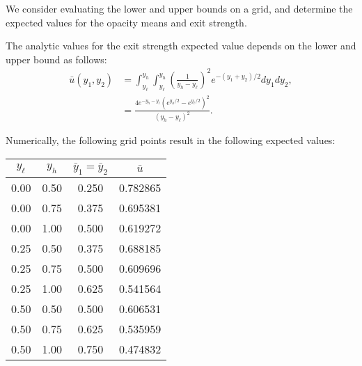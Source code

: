 We consider evaluating the lower and upper bounds
on a grid, and determine the expected values for the opacity means and exit strength.

The analytic values for the exit strength expected value depends on the lower and upper bound
as follows:
\begin{align}
  \bar u(y_1,y_2) &= \int_{y_\ell}^{y_h}\int_{y_\ell}^{y_h} \left(\frac{1}{y_h-y_\ell}\right)^2
    e^{-(y_1+y_2)/2} dy_1 dy_2, \\
    &= \frac{4e^{-y_h-y_\ell}\left(e^{y_h/2}-e^{y_\ell/2}\right)^2}{(y_h-y_\ell)^2}.
\end{align}

Numerically, the following grid points result in the following expected values:

\begin{table}[h!]
\centering
\begin{tabular}{c c|c|c}
$y_\ell$ & $y_h$ & $\bar y_1=\bar y_2$ & $\bar u$ \\ \hline
0.00 & 0.50 & 0.250 & 0.782865 \\
0.00 & 0.75 & 0.375 & 0.695381 \\
0.00 & 1.00 & 0.500 & 0.619272 \\
0.25 & 0.50 & 0.375 & 0.688185 \\
0.25 & 0.75 & 0.500 & 0.609696 \\
0.25 & 1.00 & 0.625 & 0.541564 \\
0.50 & 0.50 & 0.500 & 0.606531 \\
0.50 & 0.75 & 0.625 & 0.535959 \\
0.50 & 1.00 & 0.750 & 0.474832
\end{tabular}
\end{table}

